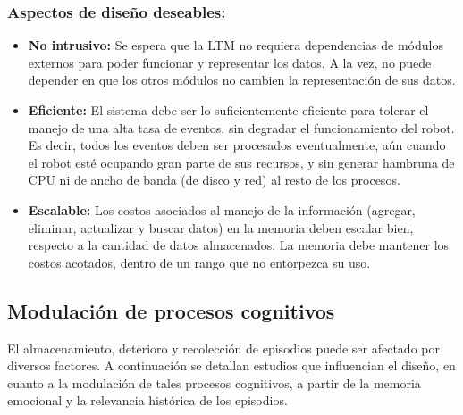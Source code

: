\subsubsection{Aspectos de diseño deseables:}

\begin{itemize}[topsep=0pt]
	\setlength\itemsep{0.2em}
	\item {} {\bfseries No intrusivo:}
	Se espera que la LTM no requiera dependencias de módulos externos para poder funcionar y representar los datos. A la vez, no puede depender en que los otros módulos no cambien la representación de sus datos.
	
	\item {} {\bfseries Eficiente:}
	El sistema debe ser lo suficientemente eficiente para tolerar el manejo de una alta tasa de eventos, sin degradar el funcionamiento del robot. Es decir, todos los eventos deben ser procesados eventualmente, aún cuando el robot esté ocupando gran parte de sus recursos, y sin generar hambruna de CPU ni de ancho de banda (de disco y red) al resto de los procesos.
	
	\item {} {\bfseries Escalable:}
	Los costos asociados al manejo de la información (agregar, eliminar, actualizar y buscar datos) en la memoria deben escalar bien, respecto a la cantidad de datos almacenados. La memoria debe mantener los costos acotados, dentro de un rango que no entorpezca su uso.
	
\end{itemize}


\subsection{Modulación de procesos cognitivos}\label{sec:theory-modulation}

El almacenamiento, deterioro y recolección de episodios puede ser afectado por diversos factores. A continuación se detallan estudios que influencian el diseño, en cuanto a la modulación de tales procesos cognitivos, a partir de la memoria emocional y la relevancia histórica de los episodios.


